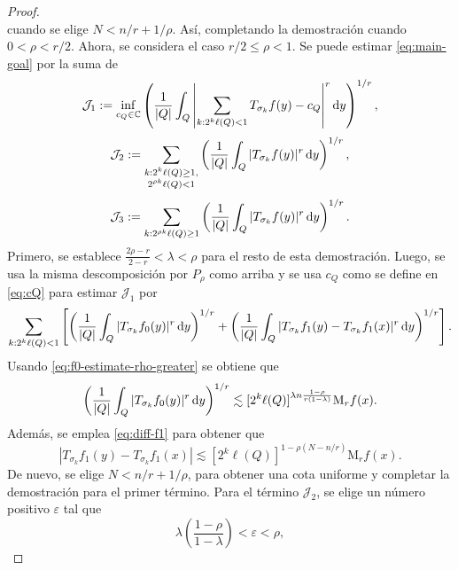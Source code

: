 \begin{proof}
\begin{equation*}
\end{equation*}
cuando se elige $N<n/r + 1/\rho$. Así, completando la demostración cuando $0<\rho<r/2 $. Ahora, se considera el caso $r/2\leq \rho<1$. Se puede estimar \cref{eq:main-goal} por la suma de 
\begin{equation*}
	\mathcal{J}_1 := \inf_{c_Q \in \mathbb{C}} \left( \frac{1}{|Q|}\int_Q \left| \sum_{k:2^k\ell(Q)<1} T_{\sigma_k} f(y) - c_Q \right|^r \mathop{}\!\mathrm{d} y
	\right)^{1/r},
\end{equation*}
\begin{equation*}
	\mathcal{J}_2 := \sum_{\substack{k:2^k\ell(Q)\geq 1, \\ 2^{\rho k}\ell(Q) <1}} \left(\frac{1}{|Q|} \int_Q |T_{\sigma_k}f(y)|^r \mathop{}\!\mathrm{d} y 
	\right)^{1/r},
\end{equation*}
\begin{equation*}
	\mathcal{J}_3 := \sum_{k:2^{\rho k} \ell(Q) \geq 1} \left( \frac{1}{|Q|} \int_Q |T_{\sigma_k}f(y)|^r \mathop{}\!\mathrm{d} y 
	\right)^{1/r}.
\end{equation*}
Primero, se establece $\frac{2\rho - r}{2-r} < \lambda < \rho$ para el resto de esta demostración. Luego, se usa la misma descomposición por $P_\rho$ como arriba y se usa $c_Q$ como se define en \cref{eq:cQ} para estimar $\mathcal{J}_1$ por
\begin{equation*}
	\sum_{k:2^k\ell(Q)<1} \left[
	\left(  \frac{1}{|Q|} \int_Q |T_{\sigma_k} f_0 (y)|^r \mathop{}\!\mathrm{d} y
	\right)^{1/r} + \left( \frac{1}{|Q|}\int_Q|T_{\sigma_k} f_1(y) -T_{\sigma_k}f_1(x)|^r \mathop{}\!\mathrm{d} y
	\right)^{1/r}
	\right].
\end{equation*}
Usando \cref{eq:f0-estimate-rho-greater} se obtiene que 
\begin{equation*}
	\left( 
	\frac{1}{|Q|} \int_Q |T_{\sigma_k} f_0 (y)|^r \mathop{}\!\mathrm{d} y
	\right)^{1/r} \lesssim [2^k\ell(Q)]^{\lambda n \frac{1-\rho}{r(1-\lambda)}} \mathrm{M}_rf(x).
\end{equation*}
Además, se emplea \cref{eq:diff-f1} para obtener que
\begin{equation*}
	|T_{\sigma_k} f_1(y) - T_{\sigma_k} f_1(x)| \lesssim [2^k\ell(Q)]^{1-\rho(N-n/r)} \mathrm{M}_rf(x).
\end{equation*}
De nuevo, se elige $N < n/r + 1/\rho$, para obtener una cota uniforme y completar la demostración para el primer término. Para el término $\mathcal{J}_2$, se elige un número positivo $\varepsilon$ tal que 
\begin{equation*}
	\lambda \left( \frac{1-\rho}{1-\lambda} \right) < \varepsilon < \rho,
\end{equation*}

\end{proof}

